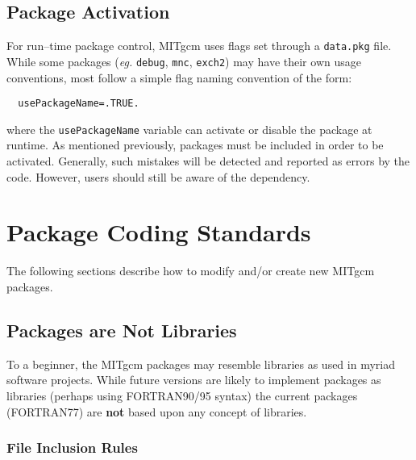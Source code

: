 \subsection{Package Activation}

For run--time package control, MITgcm uses flags set through a
\texttt{data.pkg} file.  While some packages (\textit{eg.}
\texttt{debug}, \texttt{mnc}, \texttt{exch2}) may have their own usage
conventions, most follow a simple flag naming convention of the form:
\begin{verbatim}
  usePackageName=.TRUE.
\end{verbatim}
where the \texttt{usePackageName} variable can activate or disable the
package at runtime.  As mentioned previously, packages must be
included in order to be activated.  Generally, such mistakes will be
detected and reported as errors by the code.  However, users should
still be aware of the dependency.


\section{Package Coding Standards}

The following sections describe how to modify and/or create new MITgcm
packages.

\subsection{Packages are Not Libraries}

To a beginner, the MITgcm packages may resemble libraries as used in
myriad software projects.  While future versions are likely to
implement packages as libraries (perhaps using FORTRAN90/95 syntax)
the current packages (FORTRAN77) are \textbf{not} based upon any
concept of libraries.

\subsubsection{File Inclusion Rules}

